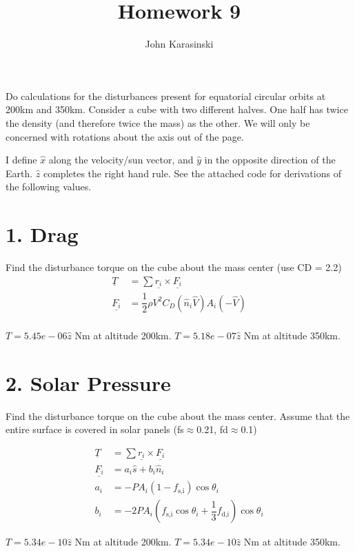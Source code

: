 \documentclass[onecolumn,10pt]{jhwhw}
\author{John Karasinski}
\title{Homework 9}
\begin{document}

Do calculations for the disturbances present for equatorial circular orbits at 200km and 350km. Consider a cube with two different halves. One half has twice the density (and therefore twice the mass) as the other. We will only be concerned with rotations about the axis out of the page.

I define $\hat{x}$ along the velocity/sun vector, and $\hat{y}$ in the opposite direction of the Earth. $\hat{z}$ completes the right hand rule. See the attached code for derivations of the following values.

\part{1. Drag}
Find the disturbance torque on the cube about the mass center (use CD = 2.2)
\begin{align*}
\underline{T} &= \sum \underline{r_i} \times \underline{F_i} \\
\underline{F_i} &= \dfrac{1}{2} \rho V^2 C_D \left( \hat{n}_i \hat{V} \right) A_i \left( - \hat{V} \right) \\
\end{align*}

$T = 5.45e-06 \hat{z}$ Nm at altitude 200km. $T = 5.18e-07 \hat{z}$ Nm at altitude 350km.

\part{2. Solar Pressure}
Find the disturbance torque on the cube about the mass center. Assume that the entire surface is covered in solar panels (fs$\approx$0.21, fd$\approx$0.1)

\begin{align*}
\underline{T} &= \sum \underline{r_i} \times \underline{F_i} \\
\underline{F_i} &= a_i \hat{s} + b_i \hat{n}_i \\
a_i &= -PA_i \left(1-f_{\mbox{s,i}} \right) \cos{\theta_i} \\
b_i &= -2PA_i \left(f_{\mbox{s,i}} \cos{\theta_i} + \dfrac{1}{3} f_{\mbox{d,i}} \right) \cos{\theta_i}
\end{align*}

$T = 5.34e-10 \hat{z}$ Nm at altitude 200km. $T = 5.34e-10 \hat{z}$ Nm at altitude 350km.
\end{document}
